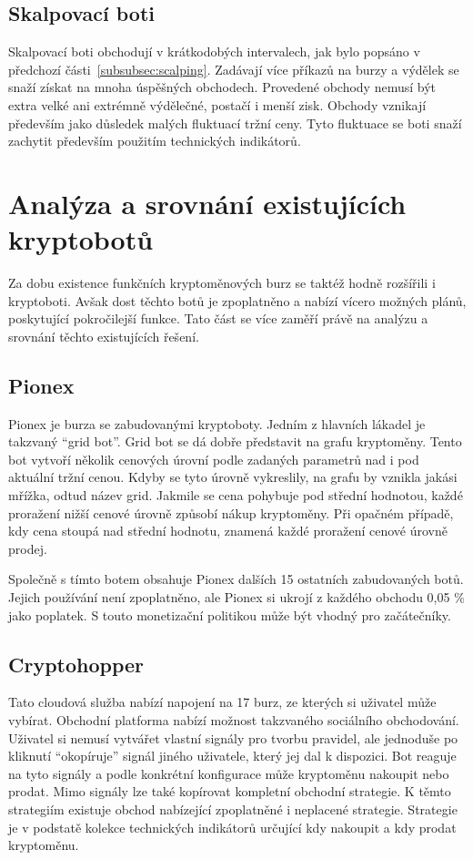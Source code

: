 \subsection{Skalpovací boti}
Skalpovací boti obchodují v krátkodobých intervalech, jak bylo popsáno v předchozí části~\ref{subsubsec:scalping}. Zadávají více příkazů na burzy a výdělek se snaží
získat na mnoha úspěšných obchodech. Provedené obchody nemusí být extra velké ani extrémně výdělečné, postačí i menší zisk. Obchody vznikají především jako důsledek
malých fluktuací tržní ceny. Tyto fluktuace se boti snaží zachytit především použitím technických indikátorů.


\section{Analýza a srovnání existujících kryptobotů}
Za dobu existence funkčních kryptoměnových burz se taktéž hodně rozšířili i kryptoboti. Avšak dost těchto botů je zpoplatněno a nabízí vícero možných plánů, poskytující
pokročilejší funkce. Tato část se více zaměří právě na analýzu a srovnání těchto existujících řešení.

\subsection{Pionex}
Pionex je burza se zabudovanými kryptoboty. Jedním z hlavních lákadel je takzvaný \enquote{grid bot}. Grid bot se dá dobře představit na grafu kryptoměny. Tento bot
vytvoří několik cenových úrovní podle zadaných parametrů nad i pod aktuální tržní cenou. Kdyby se tyto úrovně vykreslily, na grafu by vznikla jakási mřížka, odtud název
grid. Jakmile se cena pohybuje pod střední hodnotou, každé proražení nižší cenové úrovně způsobí nákup kryptoměny. Při opačném případě, kdy cena stoupá nad střední hodnotu,
znamená každé proražení cenové úrovně prodej.

Společně s tímto botem obsahuje Pionex dalších 15 ostatních zabudovaných botů. Jejich používání není zpoplatněno, ale Pionex si ukrojí z každého obchodu 0,05 \% jako poplatek.
S touto monetizační politikou může být vhodný pro začátečníky.

\subsection{Cryptohopper}
Tato cloudová služba nabízí napojení na 17 burz, ze kterých si uživatel může vybírat. Obchodní platforma nabízí možnost takzvaného sociálního obchodování. Uživatel si
nemusí vytvářet vlastní signály pro tvorbu pravidel, ale jednoduše po kliknutí \enquote{okopíruje} signál jiného uživatele, který jej dal k dispozici. Bot reaguje na tyto
signály a podle konkrétní konfigurace může kryptoměnu nakoupit nebo prodat. Mimo signály lze také kopírovat kompletní obchodní strategie. K těmto strategiím existuje
obchod nabízející zpoplatněné i neplacené strategie. Strategie je v podstatě kolekce technických indikátorů určující kdy nakoupit a kdy prodat kryptoměnu.

